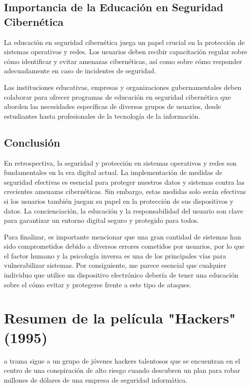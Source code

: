 \documentclass[12pt, a4paper]{article} %
\begin{document}
\subsection{Importancia de la Educación en Seguridad Cibernética}

La educación en seguridad cibernética juega un papel crucial en la protección de sistemas operativos y redes. Los usuarios deben recibir capacitación regular sobre cómo identificar y evitar amenazas cibernéticas, así como sobre cómo responder adecuadamente en caso de incidentes de seguridad.

Las instituciones educativas, empresas y organizaciones gubernamentales deben colaborar para ofrecer programas de educación en seguridad cibernética que aborden las necesidades específicas de diversos grupos de usuarios, desde estudiantes hasta profesionales de la tecnología de la información.

\subsection{Conclusión}

En retrospectiva, la seguridad y protección en sistemas operativos y redes son fundamentales en la era digital actual. La implementación de medidas de seguridad efectivas es esencial para proteger nuestros datos y sistemas contra las crecientes amenazas cibernéticas. Sin embargo, estas medidas solo serán efectivas si los usuarios también juegan su papel en la protección de sus dispositivos y datos. La concienciación, la educación y la responsabilidad del usuario son clave para garantizar un entorno digital seguro y protegido para todos.

Para finalizar, es importante mencionar que una gran cantidad de sistemas han sido comprometidos debido a diversos errores cometidos por usuarios, por lo que el factor humano y la psicología inversa es una de los principales vías para vulnerabilizar sistemas. Por consiguiente, me parece esencial que cualquier individuo que utilice un dispositivo electrónico debería de tener una educación sobre el cómo evitar y protegerse frente a este tipo de ataques.

\clearpage
\section{Resumen de la película "Hackers" (1995)}

a trama sigue a un grupo de jóvenes hackers talentosos que se encuentran en el centro de una conspiración de alto riesgo cuando descubren un plan para robar millones de dólares de una empresa de seguridad informática.
\end{document}
